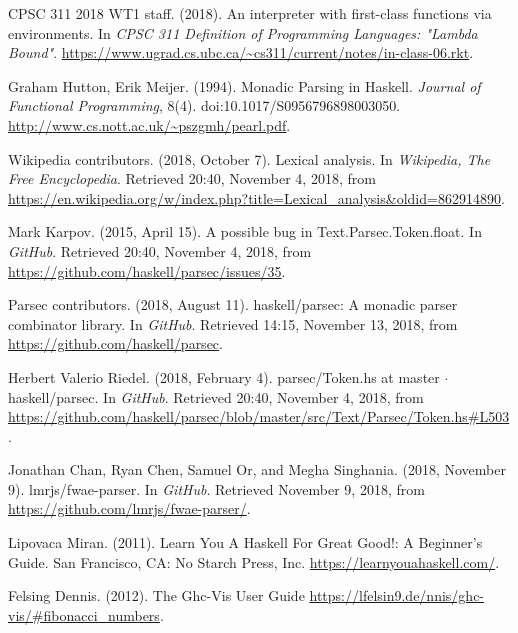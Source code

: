 \documentclass[format=acmlarge, review=false, nonacm=false, screen=true]{acmart}
\begin{document}
\begin{thebibliography}{99}

  CPSC 311 2018 WT1 staff.
  (2018).
  An interpreter with first-class functions via environments.
  In \textit{CPSC 311 Definition of Programming Languages: "Lambda Bound"}.
  \url{https://www.ugrad.cs.ubc.ca/~cs311/current/notes/in-class-06.rkt}.

  Graham Hutton, Erik Meijer.
  (1994).
  Monadic Parsing in Haskell.
  \textit{Journal of Functional Programming}, 8(4).
  doi:10.1017/S0956796898003050.
  \url{http://www.cs.nott.ac.uk/~pszgmh/pearl.pdf}.
 
  Wikipedia contributors.
  (2018, October 7).
  Lexical analysis.
  In \textit{Wikipedia, The Free Encyclopedia}.
  Retrieved 20:40, November 4, 2018, from \url{https://en.wikipedia.org/w/index.php?title=Lexical_analysis&oldid=862914890}.
  
  Mark Karpov.
  (2015, April 15).
  A possible bug in Text.Parsec.Token.float.
  In \textit{GitHub}.
  Retrieved 20:40, November 4, 2018, from \url{https://github.com/haskell/parsec/issues/35}.
  
  Parsec contributors.
  (2018, August 11).
  haskell/parsec: A monadic parser combinator library.
  In \textit{GitHub}.
  Retrieved 14:15, November 13, 2018, from \url{https://github.com/haskell/parsec}.
  
  Herbert Valerio Riedel.
  (2018, February 4).
  parsec/Token.hs at master $\cdot$ haskell/parsec.
  In \textit{GitHub}.
  Retrieved 20:40, November 4, 2018, from \url{https://github.com/haskell/parsec/blob/master/src/Text/Parsec/Token.hs#L503}.
  
  Jonathan Chan, Ryan Chen, Samuel Or, and Megha Singhania.
  (2018, November 9).
  lmrjs/fwae-parser.
  In \textit{GitHub}.
  Retrieved November 9, 2018, from \url{https://github.com/lmrjs/fwae-parser/}.
  
  Lipovaca Miran.
  (2011).
  Learn You A Haskell For Great Good!: A Beginner's Guide.
  San Francisco, CA: No Starch Press, Inc.
  \url{https://learnyouahaskell.com/}.
  
  Felsing Dennis.
  (2012).
  The Ghc-Vis User Guide
  \url{https://lfelsin9.de/nnis/ghc-vis/#fibonacci_numbers}.
  
  
\end{thebibliography}
\end{document}
